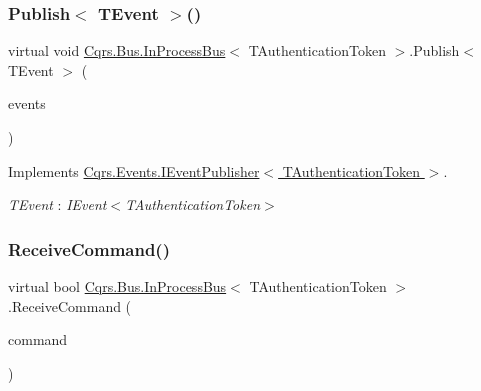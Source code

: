 \subsubsection{\texorpdfstring{Publish$<$ T\+Event $>$()}{Publish< TEvent >()}\hspace{0.1cm}{\footnotesize\ttfamily [2/2]}}
{\footnotesize\ttfamily virtual void \hyperlink{classCqrs_1_1Bus_1_1InProcessBus}{Cqrs.\+Bus.\+In\+Process\+Bus}$<$ T\+Authentication\+Token $>$.Publish$<$ T\+Event $>$ (\begin{DoxyParamCaption}\item[{I\+Enumerable$<$ T\+Event $>$}]{events }\end{DoxyParamCaption})\hspace{0.3cm}{\ttfamily [virtual]}}



Implements \hyperlink{interfaceCqrs_1_1Events_1_1IEventPublisher_a2cbcc3d2c24d015abef6337714ec51ff_a2cbcc3d2c24d015abef6337714ec51ff}{Cqrs.\+Events.\+I\+Event\+Publisher$<$ T\+Authentication\+Token $>$}.

\begin{Desc}
\item[Type Constraints]\begin{description}
\item[{\em T\+Event} : {\em I\+Event$<$T\+Authentication\+Token$>$}]\end{description}
\end{Desc}
\mbox{\label{classCqrs_1_1Bus_1_1InProcessBus_afa5b4def79709baa28fbd15c215a4111_afa5b4def79709baa28fbd15c215a4111}} 
\subsubsection{\texorpdfstring{Receive\+Command()}{ReceiveCommand()}}
{\footnotesize\ttfamily virtual bool \hyperlink{classCqrs_1_1Bus_1_1InProcessBus}{Cqrs.\+Bus.\+In\+Process\+Bus}$<$ T\+Authentication\+Token $>$.Receive\+Command (\begin{DoxyParamCaption}\item[{\hyperlink{interfaceCqrs_1_1Commands_1_1ICommand}{I\+Command}$<$ T\+Authentication\+Token $>$}]{command }\end{DoxyParamCaption})\hspace{0.3cm}{\ttfamily [virtual]}}

